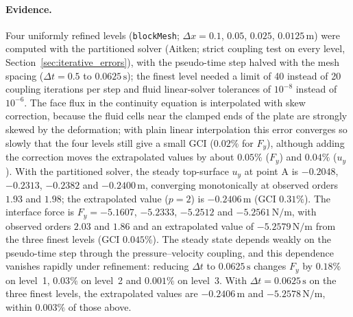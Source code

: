 \paragraph{Evidence.}
Four uniformly refined levels (\texttt{blockMesh}; $\Delta x = 0.1$, $0.05$, $0.025$, $0.0125\,\mathrm{m}$) were computed with the partitioned solver (Aitken; strict coupling test on every level, Section~\ref{sec:iterative_errors}), with the pseudo-time step halved with the mesh spacing ($\Delta t = 0.5$ to $0.0625\,\mathrm{s}$); the finest level needed a limit of 40 instead of 20 coupling iterations per step and fluid linear-solver tolerances of $10^{-8}$ instead of $10^{-6}$.
The face flux in the continuity equation is interpolated with skew correction, because the fluid cells near the clamped ends of the plate are strongly skewed by the deformation; with plain linear interpolation this error converges so slowly that the four levels still give a small GCI ($0.02\%$ for $F_y$), although adding the correction moves the extrapolated values by about $0.05\%$ ($F_y$) and $0.04\%$ ($u_y$).
With the partitioned solver, the steady top-surface $u_y$ at point A is $-0.2048$, $-0.2313$, $-0.2382$ and $-0.2400\,\mathrm{m}$, converging monotonically at observed orders $1.93$ and $1.98$; the extrapolated value ($p = 2$) is $-0.2406\,\mathrm{m}$ (GCI $0.31\%$). The interface force is $F_y = -5.1607$, $-5.2333$, $-5.2512$ and $-5.2561\,\mathrm{N/m}$, with observed orders $2.03$ and $1.86$ and an extrapolated value of $-5.2579\,\mathrm{N/m}$ from the three finest levels (GCI $0.045\%$).
The steady state depends weakly on the pseudo-time step through the pressure--velocity coupling, and this dependence vanishes rapidly under refinement: reducing $\Delta t$ to $0.0625\,\mathrm{s}$ changes $F_y$ by $0.18\%$ on level~1, $0.03\%$ on level~2 and $0.001\%$ on level~3. With $\Delta t = 0.0625\,\mathrm{s}$ on the three finest levels, the extrapolated values are $-0.2406\,\mathrm{m}$ and $-5.2578\,\mathrm{N/m}$, within $0.003\%$ of those above.

